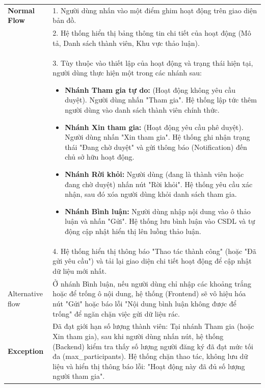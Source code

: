 \begin{xltabular}{\textwidth}{|>{\bfseries}p{3.5cm}|X|}
    \textbf{Normal Flow} & 1. Người dùng nhấn vào một điểm ghim hoạt động trên giao diện bản đồ. \\ 
    & 2. Hệ thống hiển thị bảng thông tin chi tiết của hoạt động (Mô tả, Danh sách thành viên, Khu vực thảo luận). \\ 
    & 3. Tùy thuộc vào thiết lập của hoạt động và trạng thái hiện tại, người dùng thực hiện một trong các nhánh sau:
    \vspace{0.2cm}
    \begin{itemize}[leftmargin=*, noitemsep]
        \item \textbf{Nhánh Tham gia tự do:} (Hoạt động không yêu cầu duyệt). Người dùng nhấn "Tham gia". Hệ thống lập tức thêm người dùng vào danh sách thành viên chính thức.
        \item \textbf{Nhánh Xin tham gia:} (Hoạt động yêu cầu phê duyệt). Người dùng nhấn "Xin tham gia". Hệ thống ghi nhận trạng thái "Đang chờ duyệt" và gửi thông báo (Notification) đến chủ sở hữu hoạt động.
        \item \textbf{Nhánh Rời khỏi:} Người dùng (đang là thành viên hoặc đang chờ duyệt) nhấn nút "Rời khỏi". Hệ thống yêu cầu xác nhận, sau đó xóa người dùng khỏi danh sách tham gia.
        \item \textbf{Nhánh Bình luận:} Người dùng nhập nội dung vào ô thảo luận và nhấn "Gửi". Hệ thống lưu bình luận vào CSDL và tự động cập nhật hiển thị lên luồng thảo luận.
    \end{itemize} \\ 
    & 4. Hệ thống hiển thị thông báo "Thao tác thành công" (hoặc "Đã gửi yêu cầu") và tải lại giao diện chi tiết hoạt động để cập nhật dữ liệu mới nhất. \\ \hline
    
    Alternative flow & Ở nhánh Bình luận, nếu người dùng chỉ nhập các khoảng trắng hoặc để trống ô nội dung, hệ thống (Frontend) sẽ vô hiệu hóa nút "Gửi" hoặc báo lỗi "Nội dung bình luận không được để trống" để ngăn chặn việc gửi dữ liệu rác. \\ \hline
    Exception & Đã đạt giới hạn số lượng thành viên: Tại nhánh Tham gia (hoặc Xin tham gia), sau khi người dùng nhấn nút, hệ thống (Backend) kiểm tra thấy số lượng người đăng ký đã đạt mức tối đa (max\_participants). Hệ thống chặn thao tác, không lưu dữ liệu và hiển thị thông báo lỗi: "Hoạt động này đã đủ số lượng người tham gia". \\ \hline

\end{xltabular}

